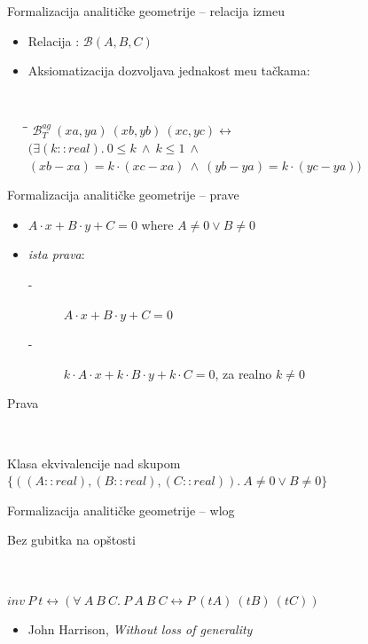 \documentclass{beamer}
\newcommand{\agbett}[3]{\ensuremath{\mathcal{B}_T^{\mathit{ag}}\ #1\ #2\ #3}}
\def\d{{\fontencoding{T1}\selectfont\dj}}
\begin{document}
\begin{frame}{Formalizacija analiti\v cke geometrije -- relacija izme\d u}
\begin{itemize}
    \item Relacija : $\mathcal{B}(A, B, C)$
    \item Aksiomatizacija  dozvoljava jednakost me\d u ta\v ckama:
      \begin{block}{}
	   {\tt
	    \begin{tabbing}
	    \hspace{5mm}\=\hspace{5mm}\=\kill
	    $\agbett{(xa, ya)}{(xb, yb)}{(xc, yc)} \longleftrightarrow$\\
	    \>$(\exists (k::real).\ 0 \le k \ \wedge\ k \le 1 \ \wedge$\\
	    \>\>$(xb - xa) = k \cdot (xc - xa) \ \wedge\ (yb - ya) = k \cdot (yc - ya))$
	    \end{tabbing}
	    }
      \end{block}
  \end{itemize}
\end{frame}

\begin{frame}{Formalizacija analiti\v cke geometrije -- prave}
\begin{itemize}
    \item $A\cdot x + B\cdot y + C = 0$ where $A \neq 0 \vee B \neq 0$
    \item {\em ista prava}:
	\begin{description}
	  \item[-] $A\cdot x + B\cdot y + C = 0$ 
	  \item[-] $k\cdot A\cdot x + k\cdot B\cdot y + k\cdot C = 0$,
	      za realno $k \neq 0$
	\end{description}
\end{itemize}
	\begin{block}{Prava}
	  {\tt
	  \begin{tabbing}
	  Klasa ekvivalencije nad skupom\\
	  \hspace{5mm}$\{((A::real), (B::real), (C::real)).\ A \neq 0 \vee B \neq 0\}$
	  \end{tabbing}
	  }
	\end{block}
\end{frame}


\begin{frame}{Formalizacija analiti\v cke geometrije -- wlog}
 \begin{block}{Bez gubitka na op\v stosti}
    {\tt
    \begin{tabbing}
    $inv\ P\ t \longleftrightarrow (\forall\ A\ B\ C.\ P\ A\ B\ C \longleftrightarrow P\ (t A)\ (t B)\ (t C))$
    \end{tabbing}
    }
  \end{block}
  \begin{itemize}
    \item John Harrison, \emph{Without loss of generality}
  \end{itemize}
\end{frame}
\end{document}

